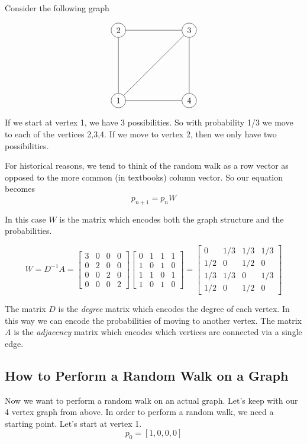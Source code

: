 \documentclass{article}
\theoremstyle{definition}
\theoremstyle{remark}
\begin{document}
Consider the following graph

\[
\begin{tikzpicture}
\node[circle,draw] (1) at (0,0){1};
\node[circle,draw] (2) at (0,3){2};
\node[circle,draw] (3) at (3,3){3};
\node[circle,draw] (4) at (3,0){4};
\foreach \from/\to in {1/2,1/3,2/3,3/4, 1/4}
\draw (\from) -- (\to);
\end{tikzpicture}
\]

If we start at vertex 1, we have 3 possibilities.  So with probability 1/3 we move to each of the vertices 2,3,4.  If we move to vertex 2, then we only have two possibilities.

For historical reasons, we tend to think of the random walk as a row vector as opposed to the more common (in textbooks) column vector.  So our equation becomes
\[
p_{n+1} = p_n W
\]

In this case $W$ is the matrix which encodes both the graph structure and the probabilities.

\[
W = D^{-1}A = \begin{bmatrix}
3 & 0 & 0 & 0\\
0 & 2 & 0 & 0\\
0 & 0 & 2 & 0\\
0 & 0 & 0 & 2
\end{bmatrix} 
\begin{bmatrix}
0 & 1 & 1 & 1\\
1 & 0 & 1 & 0\\
1 & 1 & 0 & 1\\
1 & 0 & 1 & 0
\end{bmatrix} = 
\begin{bmatrix}
0 & 1/3 & 1/3 & 1/3\\
1/2 & 0 & 1/2 & 0\\
1/3 & 1/3 & 0 & 1/3\\
1/2 & 0 & 1/2 & 0
\end{bmatrix}
\]

The matrix $D$ is the \emph{degree} matrix which encodes the degree of each vertex.  In this way we can encode the probabilities of moving to another vertex.  The matrix $A$ is the \emph{adjacency} matrix which encodes which vertices are connected via a single edge.   



\subsection{How to Perform a Random Walk on a Graph}

Now we want to perform a random walk on an actual graph.  Let's keep with our 4 vertex graph from above.  In order to perform a random walk, we need a starting point. Let's start at vertex 1.
\[
p_0 = [1, 0, 0, 0]
\]
\end{document}
